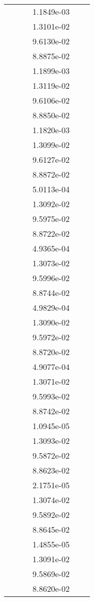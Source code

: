 \begin{xltabular}{\textwidth}{r|rS[table-format=1.3e+2]S[table-format=1.4e+2]S[table-format=1.4e+2]S[table-format=-1.5]}
&  &  & 1.1849e-03 & & \\
&  &  & 1.3101e-02 & & \\
&  &  & 9.6130e-02 & & \\
&  &  & 8.8875e-02 & & \\
&  &  & 1.1899e-03 & & \\
&  &  & 1.3119e-02 & & \\
&  &  & 9.6106e-02 & & \\
&  &  & 8.8850e-02 & & \\
&  &  & 1.1820e-03 & & \\
&  &  & 1.3099e-02 & & \\
&  &  & 9.6127e-02 & & \\
&  &  & 8.8872e-02 & & \\
&  &  & 5.0113e-04 & & \\
&  &  & 1.3092e-02 & & \\
&  &  & 9.5975e-02 & & \\
&  &  & 8.8722e-02 & & \\
&  &  & 4.9365e-04 & & \\
&  &  & 1.3073e-02 & & \\
&  &  & 9.5996e-02 & & \\
&  &  & 8.8744e-02 & & \\
&  &  & 4.9829e-04 & & \\
&  &  & 1.3090e-02 & & \\
&  &  & 9.5972e-02 & & \\
&  &  & 8.8720e-02 & & \\
&  &  & 4.9077e-04 & & \\
&  &  & 1.3071e-02 & & \\
&  &  & 9.5993e-02 & & \\
&  &  & 8.8742e-02 & & \\
&  &  & 1.0945e-05 & & \\
&  &  & 1.3093e-02 & & \\
&  &  & 9.5872e-02 & & \\
&  &  & 8.8623e-02 & & \\
&  &  & 2.1751e-05 & & \\
&  &  & 1.3074e-02 & & \\
&  &  & 9.5892e-02 & & \\
&  &  & 8.8645e-02 & & \\
&  &  & 1.4855e-05 & & \\
&  &  & 1.3091e-02 & & \\
&  &  & 9.5869e-02 & & \\
&  &  & 8.8620e-02 & & \\

\end{xltabular}
